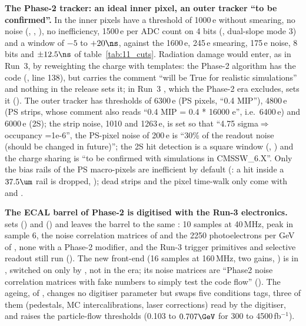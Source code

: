 \textbf{The Phase-2 tracker: an ideal inner pixel, an outer tracker ``to be confirmed''.} In
 the inner pixels have a threshold of 1000\,e
without smearing, no noise (, , ), no
inefficiency, 1500\,e per ADC count on 4 bits (, dual-slope mode 3) and a window of $-5$ to
$+20\ns$, against the 1600\,e, 245\,e smearing, 175\,e noise, 8 bits and $\pm12.5\ns$ of table~\ref{tab:11_cuts}.
Radiation damage would enter, as in Run~3, by reweighting the charge with templates: the Phase-2 algorithm has the code
(, line 138), but  carries the comment ``will be
True for realistic simulations'' and nothing in the release sets it; in Run~3 , which the Phase-2 era
excludes, sets it  (). The outer tracker has thresholds of 6300\,e (PS
pixels, ``0.4 MIP''), 4800\,e (PS strips, whose comment also reads ``0.4 MIP = 0.4 * 16000 e'', i.e.\ 6400\,e) and
6000\,e (2S); the strip noise, 1010 and 1263\,e, is set so that ``4.75 sigma$\Rightarrow$occupancy =1e-6'', the PS-pixel
noise of 200\,e is ``30\% of the readout noise (should be changed in future)''; the 2S hit detection is a square window
(, ) and the charge sharing  is ``to be confirmed with
simulations in CMSSW\_6.X''. Only the bias rails of the PS macro-pixels are inefficient by default
(: a hit inside a $37.5\um$ rail is dropped,
); dead strips and the pixel time-walk only come with
 and .

\textbf{The ECAL barrel of Phase-2 is digitised with the Run-3 electronics.}
 sets  () and
 () and leaves the barrel to the same : 10 samples at
40\,MHz, peak in sample 6, the noise correlation matrices of
 and the 2250 photoelectrons per GeV of
, none with a Phase-2 modifier, and the Run-3 trigger primitives and selective readout
still run (). The new front-end (16 samples at 160\,MHz, two gains,
) is  in , switched on only by
, not in the era; its noise matrices are ``Phase2 noise correlation matrices with fake numbers
to simply test the code flow'' (). The ageing,  of
, changes no digitiser parameter but swaps five conditions
tags, three of them (pedestals, MC intercalibrations, laser corrections) read by the digitiser, and raises the
particle-flow thresholds (0.103 to $0.707\GeV$ for 300 to 4500\,fb$^{-1}$).

